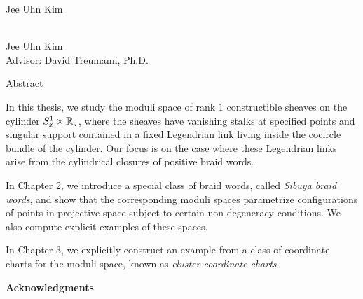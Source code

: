\maketitle

\newpage

\thispagestyle{empty}
\begin{center}
\null
\vfill
{} Jee Uhn Kim
\end{center}

\newpage

\thispagestyle{empty}
\begin{center}
{\bf \thesistitle}\\
Jee Uhn Kim\\
Advisor: David Treumann, Ph.D.
\end{center}
\begin{center}
Abstract
\end{center}

In this thesis, we study the moduli space of rank $1$ constructible sheaves on the cylinder $S^1_x \times \mathbb{R}_z$, where the sheaves have vanishing stalks at specified points and singular support contained in a fixed Legendrian link living inside the cocircle bundle of the cylinder. Our focus is on the case where these Legendrian links arise from the cylindrical closures of positive braid words.

In Chapter 2, we introduce a special class of braid words, called \emph{Sibuya braid words}, and show that the corresponding moduli spaces parametrize configurations of points in projective space subject to certain non-degeneracy conditions. We also compute explicit examples of these spaces.

In Chapter 3, we explicitly construct an example from a class of coordinate charts for the moduli space, known as \emph{cluster coordinate charts}.

\frontmatter %

\thispagestyle{plain}
{}
\cfoot{\thepage}
\tableofcontents

\newpage

\thispagestyle{plain}
{}
\cfoot{\thepage}
\listoffigures

\newpage

\thispagestyle{plain}
{}
\cfoot{\thepage}
\vspace*{0.75in}
\begin{center}
{\Large\textbf{Acknowledgments}}
\end{center}
\
\
\noindent
\bigskip

